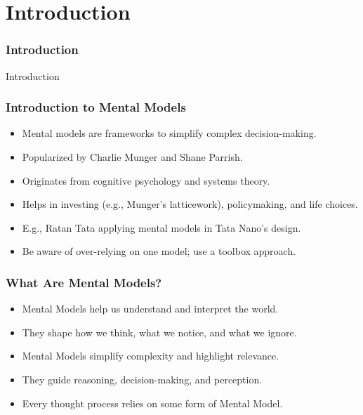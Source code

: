\section{Introduction}

\begin{frame}[fragile]\frametitle{Introduction}
\begin{center}
{\Large Introduction}
\end{center}
\end{frame}


\begin{frame}[fragile]\frametitle{Introduction to Mental Models}
  \begin{itemize}
    \item Mental models are frameworks to simplify complex decision-making.
    \item Popularized by Charlie Munger and Shane Parrish.
    \item Originates from cognitive psychology and systems theory.
    \item Helps in investing (e.g., Munger's latticework), policymaking, and life choices.
    \item E.g., Ratan Tata applying mental models in Tata Nano's design.
    \item Be aware of over-relying on one model; use a toolbox approach.
  \end{itemize}
\end{frame}

\begin{frame}[fragile]\frametitle{What Are Mental Models?}
      \begin{itemize}
        \item Mental Models help us understand and interpret the world.
        \item They shape how we think, what we notice, and what we ignore.
        \item Mental Models simplify complexity and highlight relevance.
        \item They guide reasoning, decision-making, and perception.
        \item Every thought process relies on some form of Mental Model.
      \end{itemize}
\end{frame}

